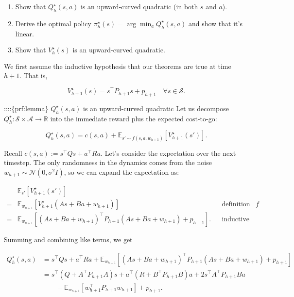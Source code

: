 \documentclass[
  letterpaper,
  DIV=11,
  numbers=noendperiod]{scrreprt}
\providecommand{\tightlist}{%
  \setlength{\itemsep}{0pt}\setlength{\parskip}{0pt}}\usepackage{longtable,booktabs,array}
\theoremstyle{plain}
\theoremstyle{plain}
\theoremstyle{definition}
\theoremstyle{definition}
\theoremstyle{remark}
\begin{document}
\begin{enumerate}
\def\labelenumi{\arabic{enumi}.}
\tightlist
\item
  Show that \(Q^\star_h(s, a)\) is an upward-curved quadratic (in both
  \(s\) and \(a\)).
\item
  Derive the optimal policy
  \(\pi^\star_h(s) = \arg \min_aQ^\star_h(s, a)\) and show that it's
  linear.
\item
  Show that \(V^\star_h(s)\) is an upward-curved quadratic.
\end{enumerate}

We first assume the inductive hypothesis that our theorems are true at
time \(h+1\). That is,

\[
V^\star_{h+1}(s) = s^\top P_{h+1} s+ p_{h+1} \quad \forall s\in \mathcal{S}.
\]

::::\{prf:lemma\} \(Q^\star_h(s, a)\) is an upward-curved quadratic Let
us decompose
\(Q^\star_h: \mathcal{S} \times \mathcal{A} \to \mathbb{R}\) into the
immediate reward plus the expected cost-to-go:

\[
Q^\star_h(s, a) = c(s, a) + \mathbb{E}_{s' \sim f(s, a, w_{h+1})} [V^\star_{h+1}(s')].
\]

Recall \(c(s, a) := s^\top Q s+ a^\top R a\). Let's consider the
expectation over the next timestep. The only randomness in the dynamics
comes from the noise \(w_{h+1} \sim \mathcal{N}(0, \sigma^2 I)\), so we
can expand the expectation as:

\[
\begin{aligned}
            & \mathbb{E}_{s'} [V^\star_{h+1}(s')]                                                                                                         \\
    {} = {} & \mathbb{E}_{w_{h+1}} [V^\star_{h+1}(A s+ B a+ w_{h+1})]                                             &  & \text{definition of } f     \\
    {} = {} & \mathbb{E}_{w_{h+1}} [ (A s+ B a+ w_{h+1})^\top P_{h+1} (A s+ B a+ w_{h+1}) + p_{h+1} ]. &  & \text{inductive hypothesis}
\end{aligned}
\]

Summing and combining like terms, we get

\[
\begin{aligned}
    Q^\star_h(s, a) & = s^\top Q s+ a^\top R a+ \mathbb{E}_{w_{h+1}} [(A s+ B a+ w_{h+1})^\top P_{h+1} (A s+ B a+ w_{h+1}) + p_{h+1}] \\
                           & = s^\top (Q + A^\top P_{h+1} A)s+ a^\top (R + B^\top P_{h+1} B) a+ 2 s^\top A^\top P_{h+1} B a\\
                           & \qquad + \mathbb{E}_{w_{h+1}} [w_{h+1}^\top P_{h+1} w_{h+1}] + p_{h+1}.
\end{aligned}
\]
\end{document}
